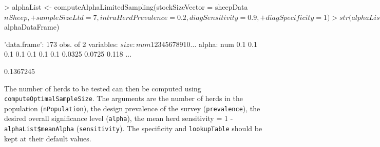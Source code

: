 \documentclass[nojss]{jss}
\begin{document}
\begin{Schunk}
\begin{Sinput}
> alphaList <- computeAlphaLimitedSampling(stockSizeVector = sheepData$nSheep, 
+      sampleSizeLtd = 7, intraHerdPrevalence = 0.2, diagSensitivity = 0.9, 
+      diagSpecificity = 1)
> str(alphaList$alphaDataFrame) 
\end{Sinput}
\begin{Soutput}
'data.frame':	173 obs. of  2 variables:
 $ size : num  1 2 3 4 5 6 7 8 9 10 ...
 $ alpha: num  0.1 0.1 0.1 0.1 0.1 0.1 0.1 0.0325 0.0725 0.118 ...
\end{Soutput}
\begin{Soutput}
[1] 0.1367245
\end{Soutput}
\end{Schunk}

The number of herds to be tested can then be computed using 
\texttt{computeOptimalSampleSize}. The arguments are the number of 
herds in the population (\texttt{nPopulation}), the design 
prevalence of the survey (\texttt{prevalence}), the desired overall 
significance level (\texttt{alpha}), the mean herd sensitivity = 1 - 
\texttt{alphaList\$meanAlpha} (\texttt{sensitivity}). The specificity and 
\texttt{lookupTable} should be kept at their default values.



\printindex


\end{document}
